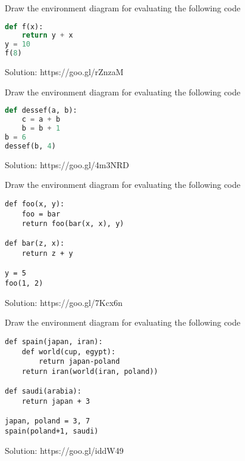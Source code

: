 \question
Draw the environment diagram for evaluating the following code
\begin{lstlisting}[language=Python]
def f(x):
    return y + x
y = 10
f(8)
\end{lstlisting}
\begin{solution}[3in]
Solution: https://goo.gl/rZnzaM
\end{solution}
\question
Draw the environment diagram for evaluating the following code
\begin{lstlisting}[language=Python]
def dessef(a, b):
    c = a + b
    b = b + 1
b = 6
dessef(b, 4)
\end{lstlisting}

\begin{solution}[.1in]
Solution: https://goo.gl/4m3NRD
\end{solution}
\newpage
\question
Draw the environment diagram for evaluating the following code
\begin{lstlisting}
def foo(x, y):
    foo = bar
    return foo(bar(x, x), y)
	
def bar(z, x):
    return z + y
	
y = 5
foo(1, 2)
\end{lstlisting}
\begin{solution}[2.5in]
Solution: 	https://goo.gl/7Kcx6n
\end{solution}

\question
Draw the environment diagram for evaluating the following code
\begin{lstlisting}
def spain(japan, iran):
    def world(cup, egypt):
	    return japan-poland
    return iran(world(iran, poland))

def saudi(arabia):
    return japan + 3
	
japan, poland = 3, 7
spain(poland+1, saudi)
\end{lstlisting}
\begin{solution}
Solution: 	https://goo.gl/iddW49
\end{solution}


